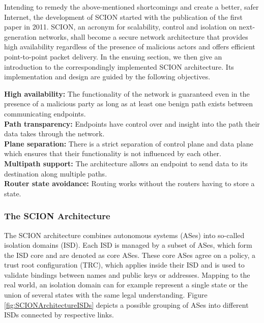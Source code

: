 Intending to remedy the above-mentioned shortcomings and create a better, safer Internet, the development of SCION started with the publication of the first paper \cite{SCIONPaper} in 2011. SCION, an acronym for scalability, control and isolation on next-generation networks, shall become a secure network architecture that provides high availability regardless of the presence of malicious actors and offers efficient point-to-point packet delivery. In the ensuing section, we then give an introduction to the correspondingly implemented SCION architecture. Its implementation and design are guided by the following objectives.

{\small \textbf{High availability:} The functionality of the network is guaranteed even in the presence of a malicious party as long as at least one benign path exists between communicating endpoints. \smallskip\\
	\textbf{Path transparency:} Endpoints have control over and insight into the path their data takes through the network. \smallskip\\
	\textbf{Plane separation:} There is a strict separation of control plane and data plane which ensures that their functionality is not influenced by each other. \smallskip\\
	\textbf{Multipath support:} The architecture allows an endpoint to send data to its destination along multiple paths. \smallskip\\
	\textbf{Router state avoidance:} Routing works without the routers having to store a state.
}

\subsubsection{The SCION Architecture}

The SCION architecture combines autonomous systems (ASes) into so-called isolation domains (ISD). Each ISD is managed by a subset of ASes, which form the ISD core and are denoted as core ASes. These core ASes agree on a policy, a trust root configuration (TRC), which applies inside their ISD and is used to validate bindings between names and public keys or addresses. Mapping to the real world, an isolation domain can for example represent a single state or the union of several states with the same legal understanding. Figure \ref{fig:SCIONArchitectureISDs} depicts a possible grouping of ASes into different ISDs connected by respective links.

